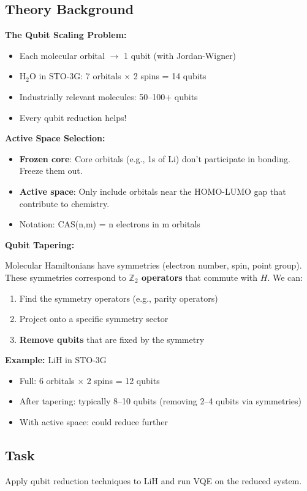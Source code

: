 \documentclass[11pt,a4paper]{article}
\begin{document}
\subsection*{Theory Background}
\textbf{The Qubit Scaling Problem:}
\begin{itemize}
    \item Each molecular orbital $\to$ 1 qubit (with Jordan-Wigner)
    \item H$_2$O in STO-3G: 7 orbitals $\times$ 2 spins = 14 qubits
    \item Industrially relevant molecules: 50--100+ qubits
    \item Every qubit reduction helps!
\end{itemize}

\textbf{Active Space Selection:}
\begin{itemize}
    \item \textbf{Frozen core}: Core orbitals (e.g., 1s of Li) don't participate in bonding. Freeze them out.
    \item \textbf{Active space}: Only include orbitals near the HOMO-LUMO gap that contribute to chemistry.
    \item Notation: CAS(n,m) = n electrons in m orbitals
\end{itemize}

\textbf{Qubit Tapering:}

Molecular Hamiltonians have symmetries (electron number, spin, point group). These symmetries correspond to \textbf{$\mathbb{Z}_2$ operators} that commute with $H$. We can:
\begin{enumerate}
    \item Find the symmetry operators (e.g., parity operators)
    \item Project onto a specific symmetry sector
    \item \textbf{Remove qubits} that are fixed by the symmetry
\end{enumerate}

\textbf{Example:} LiH in STO-3G
\begin{itemize}
    \item Full: 6 orbitals $\times$ 2 spins = 12 qubits
    \item After tapering: typically 8--10 qubits (removing 2--4 qubits via symmetries)
    \item With active space: could reduce further
\end{itemize}

\subsection*{Task}
Apply qubit reduction techniques to LiH and run VQE on the reduced system.
\end{document}
